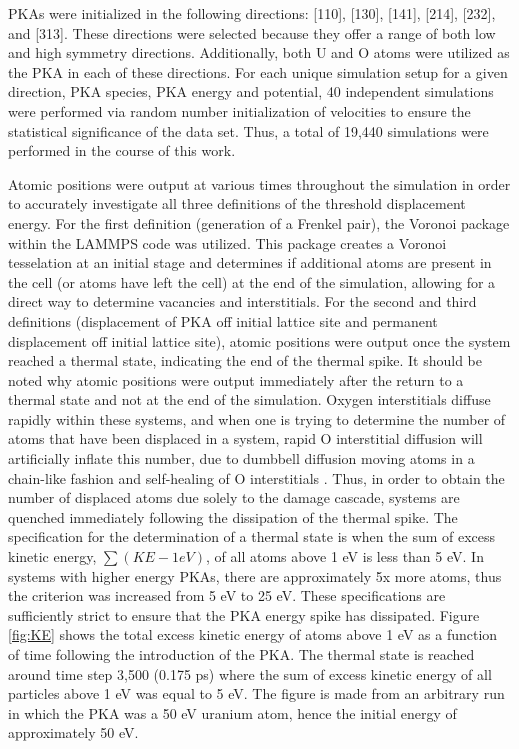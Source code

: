 \documentclass[8pt]{article}   	%
\begin{document}
PKAs were initialized in the following directions: [110], [130], [141], [214], [232], and [313]. These directions were selected because they offer a range of both low and high symmetry directions. Additionally, both U and O atoms were utilized as the PKA in each of these directions. For each unique simulation setup for a given direction, PKA species, PKA energy and potential, 40 independent simulations were performed via random number initialization of velocities to ensure the statistical significance of the data set. Thus, a total of 19,440 simulations were performed in the course of this work.

Atomic positions were output at various times throughout the simulation in order to accurately investigate all three definitions of the threshold displacement energy. For the first definition (generation of a Frenkel pair), the Voronoi package within the LAMMPS code \cite{lammps,voro} was utilized. This package creates a Voronoi tesselation at an initial stage and determines if additional atoms are present in the cell (or atoms have left the cell) at the end of the simulation, allowing for a direct way to determine vacancies and interstitials. For the second and third definitions (displacement of PKA off initial lattice site and permanent displacement off initial lattice site), atomic positions were output once the system reached a thermal state, indicating the end of the thermal spike. It should be noted why atomic positions were output immediately after the return to a thermal state and not at the end of the simulation. Oxygen interstitials diffuse rapidly within these systems, and when one is trying to determine the number of atoms that have been displaced in a system, rapid O interstitial diffusion will artificially inflate this number, due to dumbbell diffusion moving atoms in a chain-like fashion and self-healing of O interstitials \cite{ajay}. Thus, in order to obtain the number of displaced atoms due solely to the damage cascade, systems are quenched immediately following the dissipation of the thermal spike. The specification for the determination of a thermal state is when the sum of excess kinetic energy, $\sum (KE-1 eV)$, of all atoms above 1 eV is less than 5 eV. In systems with higher energy PKAs, there are approximately 5x more atoms, thus the criterion was increased from 5 eV to 25 eV. These specifications are sufficiently strict to ensure that the PKA energy spike has dissipated. Figure \ref{fig:KE} shows the total excess kinetic energy of atoms above 1 eV as a function of time following the introduction of the PKA. The thermal state is reached around time step 3,500 (0.175 ps) where the sum of excess kinetic energy of all particles above 1 eV was equal to 5 eV. The figure is made from an arbitrary run in which the PKA was a 50 eV uranium atom, hence the initial energy of approximately 50 eV.
\end{document}
